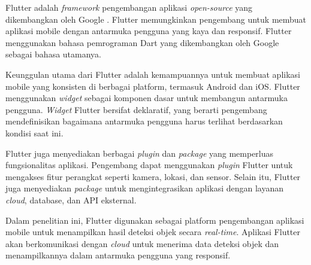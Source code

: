 Flutter adalah \emph{framework} pengembangan aplikasi \emph{open-source} yang dikembangkan oleh Google \parencite*{google2024}. Flutter memungkinkan pengembang untuk membuat aplikasi mobile dengan antarmuka pengguna yang kaya dan responsif. Flutter menggunakan bahasa pemrograman Dart yang dikembangkan oleh Google sebagai bahasa utamanya.

Keunggulan utama dari Flutter adalah kemampuannya untuk membuat aplikasi mobile yang konsisten di berbagai platform, termasuk Android dan iOS. Flutter menggunakan \emph{widget} sebagai komponen dasar untuk membangun antarmuka pengguna. \emph{Widget} Flutter bersifat deklaratif, yang berarti pengembang mendefinisikan bagaimana antarmuka pengguna harus terlihat berdasarkan kondisi saat ini.

Flutter juga menyediakan berbagai \emph{plugin} dan \emph{package} yang memperluas fungsionalitas aplikasi. Pengembang dapat menggunakan \emph{plugin} Flutter untuk mengakses fitur perangkat seperti kamera, lokasi, dan sensor. Selain itu, Flutter juga menyediakan \emph{package} untuk mengintegrasikan aplikasi dengan layanan \emph{cloud}, database, dan API eksternal.

Dalam penelitian ini, Flutter digunakan sebagai platform pengembangan aplikasi mobile untuk menampilkan hasil deteksi objek secara \emph{real-time}. Aplikasi Flutter akan berkomunikasi dengan \emph{cloud} untuk menerima data deteksi objek dan menampilkannya dalam antarmuka pengguna yang responsif.



